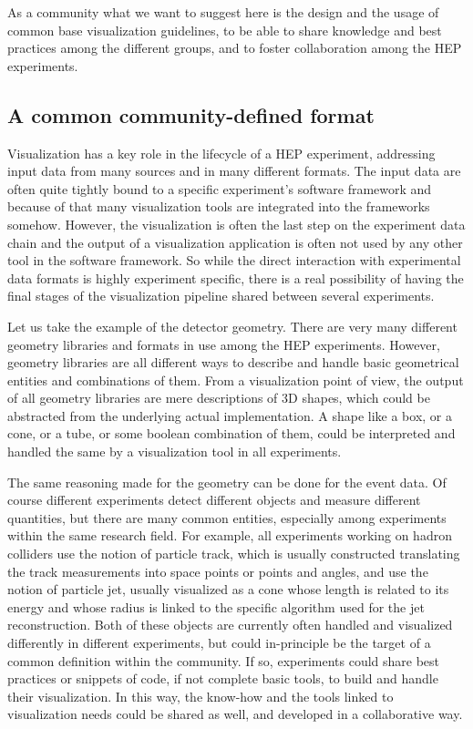 \documentclass[12pt,a4paper]{article}
\begin{document}
As a community what we want to suggest here is the design and the usage of common base visualization guidelines,
to be able to share knowledge and best practices among the different groups, and to foster collaboration among the HEP experiments.

\hypertarget{common-format}{%
\subsection{A common community-defined format}\label{common-format}}

Visualization has a key role in the lifecycle of a HEP experiment, addressing input data from many sources and in many different formats.
The input data are often quite tightly bound to a specific experiment's software framework and because of that many visualization tools
are integrated into the frameworks somehow. However, the visualization is often the last step on the experiment data chain and the
output of a visualization application is often not used by any other tool in the software framework. So while the direct interaction with experimental data
formats is highly experiment specific, there is a real possibility of having the final stages of the visualization pipeline
shared between several experiments.

Let us take the example of the detector geometry. There are very many different geometry libraries and formats in use among the HEP experiments.
However, geometry libraries are all different ways to describe and handle basic geometrical entities and combinations of them.
From a visualization point of view, the output of all geometry libraries are mere descriptions of 3D shapes, which could be abstracted
from the underlying actual implementation. A shape like a box, or a cone, or a tube, or some boolean combination of them, could be
interpreted and handled the same by a visualization tool in all experiments.

The same reasoning made for the geometry can be done for the event data. Of course different experiments detect different objects
and measure different quantities, but there are many common entities, especially among experiments within the same research field.
For example, all experiments working on hadron colliders use the notion of particle track, which is usually constructed translating
the track measurements into space points or points and angles, and use the notion of particle jet, usually
visualized as a cone whose length is related to its energy and whose radius is linked to the specific algorithm used for the jet
reconstruction. Both of these objects are currently often handled and visualized differently in different experiments, but could in-principle
be the target of a common definition within the community. If so, experiments could share best practices or snippets of code,
if not complete basic tools, to build and handle their visualization. In this way, the know-how and the tools linked to visualization needs
could be shared as well, and developed in a collaborative way.
\end{document}
